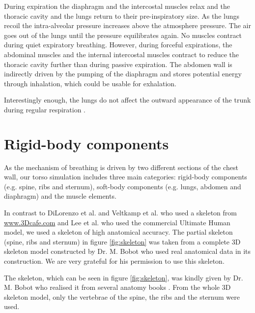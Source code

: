 During expiration the diaphragm and the intercostal muscles relax and the thoracic cavity and the lungs return to their pre-inspiratory size. As the lungs recoil the intra-alveolar pressure increases above the atmosphere pressure. The air goes out of the lungs until the pressure equilibrates again. No muscles contract during quiet expiratory breathing. However, during forceful expirations, the abdominal muscles and the internal intercostal muscles contract to reduce the thoracic cavity further than during passive expiration. The abdomen wall is indirectly driven by the pumping of the diaphragm and stores potential energy through inhalation, which could be usable for exhalation.

Interestingly enough, the lungs do not affect the outward appearance of the trunk during regular respiration \cite{zordan2004breathe}.

\section{\label{sec:rigid_body_component}Rigid-body components}
As the mechanism of breathing is driven by two different sections of the chest wall, our torso simulation includes three main categories: rigid-body components (e.g. spine, ribs and sternum), soft-body components (e.g. lungs, abdomen and diaphragm) and the muscle elements.
	
In contrast to DiLorenzo et al. \cite{dilorenzo2009breathing} and Veltkamp et al. \cite{veltkamp2009physiological} who used a skeleton from \url{www.3Dcafe.com} and Lee et al. \cite{lee2008biomechanical} who used the commercial Ultimate Human model, we used a skeleton of high anatomical accuracy. The partial skeleton (spine, ribs and sternum) in figure \ref{fig:skeleton} was taken from a complete 3D skeleton model constructed by Dr. M. Bobot who used real anatomical data in its construction. We are very grateful for his permission to use this skeleton.

 The skeleton, which can be seen in figure \ref{fig:skeleton}, was kindly given by Dr. M. Bobot who realised it from several anatomy books \cite{sobotta1977atlas, netter2009atlas, gray1918anatomy}. From the whole 3D skeleton model, only the vertebrae of the spine, the ribs and the sternum were used.


